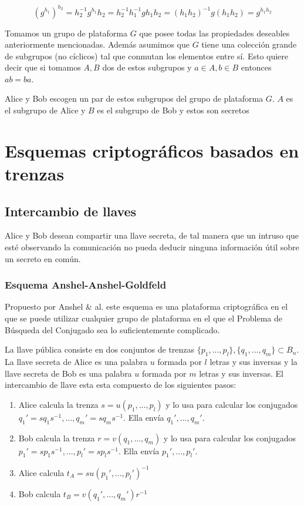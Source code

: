 \documentclass[12pt]{article}
\theoremstyle{definition}
\begin{document}
$$(g^{h_1})^{h_2}= h_2^{-1}g^{h_1}h_2= h_2^{-1}h_1^{-1}gh_1h_2 = (h_1h_2)^{-1}g(h_1h_2) =g^{h_1h_2}$$

Tomamos un grupo de plataforma $G$ que posee todas las propiedades deseables anteriormente mencionadas. Además asumimos que $G$ tiene una colección grande de subgrupos (no cíclicos) tal que conmutan los elementos entre sí. Esto quiere decir que si tomamos $A,B$ dos de estos subgrupos y $a\in A, b \in B$ entonces $ab=ba$.

Alice y Bob escogen un par de estos subgrupos del grupo de plataforma $G$. $A$ es el subgrupo de Alice y $B$ es el subgrupo de Bob y estos son secretos



\section{Esquemas criptográficos basados en trenzas}

\subsection{Intercambio de llaves}
Alice y Bob desean compartir una llave secreta, de tal manera que un intruso que esté observando la comunicación no pueda deducir ninguna información útil sobre un secreto en común.
\subsubsection{Esquema Anshel-Anshel-Goldfeld}
Propuesto por Anshel \& al. este esquema es una plataforma criptográfica en el que se puede utilizar cualquier grupo de plataforma en el que el Problema de Búsqueda del Conjugado sea lo suficientemente complicado.

La llave pública consiste en dos conjuntos de trenzas $\{p_1,...,p_l\},\{q_1,...,q_m\}\subset B_n$. La llave secreta de Alice es una palabra $u$ formada por $l$ letras y sus inversas y la llave secreta de Bob es una palabra $u$ formada por $m$ letras y sus inversas. El intercambio de llave esta esta compuesto de los siguientes pasos:

\begin{enumerate}
\item Alice calcula la trenza $s = u(p_1,...,p_l)$ y lo usa para calcular los conjugados $q_1'=sq_1s^{-1},...,q_m'=sq_ms^{-1}$. Ella envía $q_1',...,q_m'.$
\item Bob calcula la trenza $r = v(q_1,...,q_m)$ y lo usa para calcular los conjugados $p_1'=sp_1s^{-1},...,p_l'=sp_ls^{-1}$. Ella envía $p_1',...,p_l'.$
\item Alice calcula $t_A = su(p_1',...,p_l')^{-1}$
\item Bob calcula $t_B = v(q_1',...,q_m')r^{-1}$
\end{enumerate}
\end{document}
